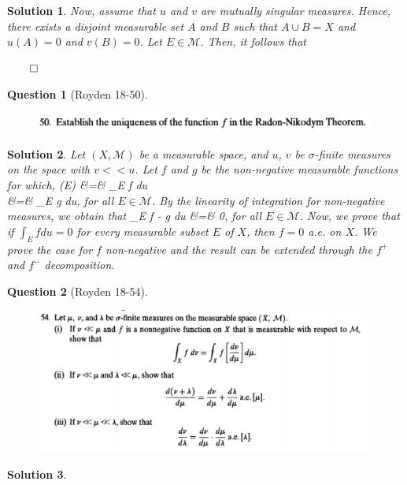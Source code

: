 \documentclass{article} %
\def\eQb#1\eQe{\begin{eqnarray*}#1\end{eqnarray*}}
\theoremstyle{quest}
\newtheorem*{question}{Question}
\newtheorem*{solution}{Solution}
\begin{document}
\begin{solution}
\smallskip

Now, assume that $u$ and $v$ are mutually singular measures. 
Hence, there exists a disjoint measurable set $A$ and $B$ such that
$A \cup B = X$ and $u(A) = 0$ and $v(B) = 0$. Let $E \in \mathscr{M}$.
Then, it follows that 
 

\hfill $\qed$ 

\end{solution}

\newpage

\begin{question}[Royden 18-50]
\hfill
\begin{figure}[h!]
  \centering
    \includegraphics[width=1\textwidth]{rv-18-50.png}
\end{figure}
\end{question}
\begin{solution}
Let $(X,\mathscr{M})$ be a measurable space, and $u$, $v$ be $\sigma$-finite
measures on the space with $v << u$.
Let $f$ and $g$ be the non-negative measurable functions for which,
\eQb
v(E) &=& \int_{E} f du \\
&=& \int_{E} g du,
\eQe
for all $E \in \mathscr{M}$. By the linearity of integration for non-negative
measures, we obtain that
\eQb
\int_{E} f - g du &=& 0,
\eQe
for all $E \in \mathscr{M}$. Now, we prove that if $\int_{E} f du = 0$
for every measurable subset $E$ of $X$, then $f = 0$ a.e. on $X$. We 
prove the case for $f$ non-negative and the result can be extended through
the $f^+$ and $f^-$ decomposition.   

\end{solution}

\newpage

\begin{question}[Royden 18-54]
\hfill
\begin{figure}[h!]
  \centering
    \includegraphics[width=1\textwidth]{rv-18-54.png}
\end{figure}
\end{question}
\begin{solution}

\end{solution}
\newpage
\end{document}
